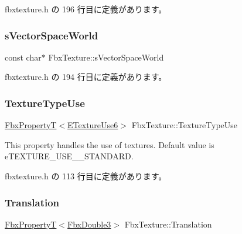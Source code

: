  fbxtexture.\+h の 196 行目に定義があります。

\mbox{\label{class_fbx_texture_a0811135bfb05bae900c5100c5597af52}} 
\subsubsection{\texorpdfstring{s\+Vector\+Space\+World}{sVectorSpaceWorld}}
{\footnotesize\ttfamily const char$\ast$ Fbx\+Texture\+::s\+Vector\+Space\+World\hspace{0.3cm}{\ttfamily [static]}}



 fbxtexture.\+h の 194 行目に定義があります。

\mbox{\label{class_fbx_texture_a4813ec19bc568f47011cc1ce6c71f39e}} 
\subsubsection{\texorpdfstring{Texture\+Type\+Use}{TextureTypeUse}}
{\footnotesize\ttfamily \hyperlink{class_fbx_property_t}{Fbx\+PropertyT}$<$\hyperlink{class_fbx_texture_a321c489f8a8a5294298ffbf0ed361db9}{E\+Texture\+Use6}$>$ Fbx\+Texture\+::\+Texture\+Type\+Use}

This property handles the use of textures. Default value is e\+T\+E\+X\+T\+U\+R\+E\+\_\+\+U\+S\+E\+\_\+\_\+\+S\+T\+A\+N\+D\+A\+RD. 

 fbxtexture.\+h の 113 行目に定義があります。

\mbox{\label{class_fbx_texture_a94d73d8c789b8717b32ad5bba86ac42f}} 
\subsubsection{\texorpdfstring{Translation}{Translation}}
{\footnotesize\ttfamily \hyperlink{class_fbx_property_t}{Fbx\+PropertyT}$<$\hyperlink{fbxtypes_8h_ae0a96f14cde566774c7553aa7523b7a7}{Fbx\+Double3}$>$ Fbx\+Texture\+::\+Translation}

